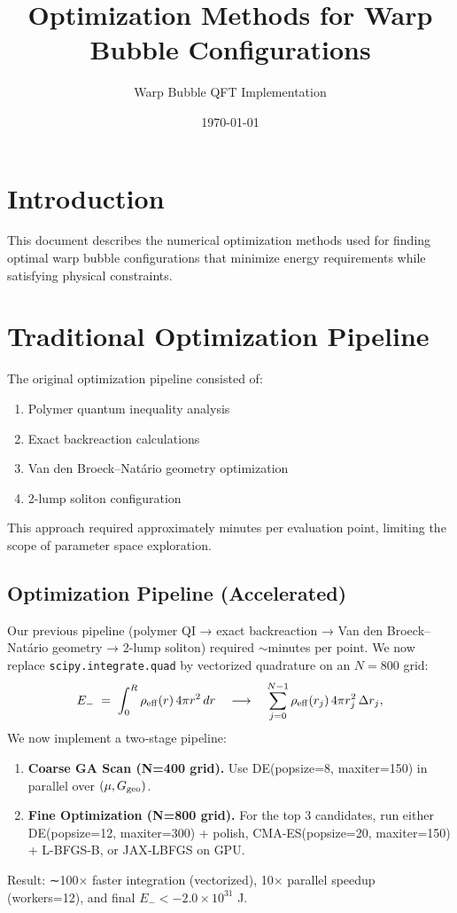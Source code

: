 \documentclass[12pt]{article}
\title{Optimization Methods for Warp Bubble Configurations}
\author{Warp Bubble QFT Implementation}
\date{\today}
\begin{document}
\maketitle

\section{Introduction}

This document describes the numerical optimization methods used for finding optimal warp bubble configurations that minimize energy requirements while satisfying physical constraints.

\section{Traditional Optimization Pipeline}

The original optimization pipeline consisted of:
\begin{enumerate}
\item Polymer quantum inequality analysis
\item Exact backreaction calculations
\item Van den Broeck–Natário geometry optimization
\item 2-lump soliton configuration
\end{enumerate}

This approach required approximately minutes per evaluation point, limiting the scope of parameter space exploration.

\subsection{Optimization Pipeline (Accelerated)}

Our previous pipeline (polymer QI → exact backreaction → Van den Broeck–Natário geometry → 2-lump soliton) required \(\sim\)minutes per point. We now replace \texttt{scipy.integrate.quad} by vectorized quadrature on an \(N=800\) grid:
\[  E_{-} \;=\; \int_0^R \rho_{\rm eff}(r)\,4\pi r^2 \,dr 
  \quad\longrightarrow\quad
  \sum_{j=0}^{N-1} \rho_{\rm eff}(r_j)\,4\pi r_j^2\,\Delta r_j,
\]
We now implement a two‐stage pipeline: 
\begin{enumerate}
  \item \textbf{Coarse GA Scan (N=400 grid).}  Use DE(popsize=8, maxiter=150) in parallel over \((\mu,G_{\rm geo})\).  
  \item \textbf{Fine Optimization (N=800 grid).}  For the top 3 candidates, run either DE(popsize=12, maxiter=300) + polish, CMA-ES(popsize=20, maxiter=150) + L-BFGS-B, or JAX‐LBFGS on GPU.  
\end{enumerate}
Result: ∼100× faster integration (vectorized), 10× parallel speedup (workers=12), and final \(E_- < -2.0\times10^{31}\) J.
\end{document}
